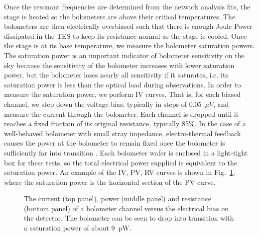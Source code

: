 Once the resonant frequencies are determined from the network analysis fits, the stage is heated so the bolometers are above their critical temperatures. 
The bolometers are then electrically overbiased such that there is enough Joule Power dissipated in the \ac{TES} to keep its resistance normal as the stage is cooled. 
Once the stage is at its base temperature, we measure the bolometer saturation powers. 
The saturation power is an important indicator of bolometer sensitivity on the sky because the sensitivity of the bolometer increases with lower saturation power, but the bolometer loses nearly all sensitivity if it saturates, i.e. its saturation power is less than the optical load during observations. 
In order to measure the saturation power, we perform IV curves. 
That is, for each biased channel, we step down the voltage bias, typically in steps of 0.05~$\mu V$, and measure the current through the bolometer. 
Each channel is dropped until it reaches a fixed fraction of its original resistance, typically 85\%.
In the case of a well-behaved bolometer with small stray impedance, electro-thermal feedback causes the power at the bolometer to remain fixed once the bolometer is sufficiently far into transition \cite{lanting_thesis}.
Each bolometer wafer is enclosed in a light-tight box for these tests, so the total electrical power supplied is equivalent to the saturation power. 
An example of the IV, PV, RV curves is shown in Fig.~\ref{fig:bolo_iv_curve}, where the saturation power is the horizontal section of the PV curve.

\begin{figure}[htbp]
\begin{center}
\caption{The current (top panel), power (middle panel) and resistance (bottom panel) of a bolometer channel versus the electrical bias on the detector. The bolometer can be seen to drop into transition with a saturation power of about 9~pW.    }
\label{fig:bolo_iv_curve}
\end{center}
\end{figure}

